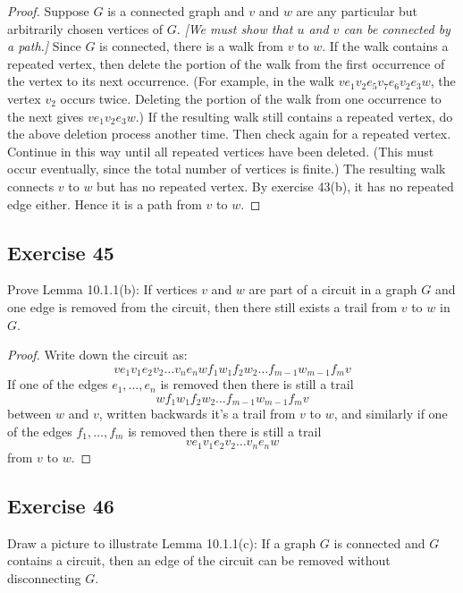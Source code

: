 \documentclass[14pt]{extarticle}
\begin{document}
\begin{proof}
Suppose \(G\) is a connected graph and \(v\) and \(w\) are any particular but arbitrarily chosen vertices of \(G\). {\it [We 
must show that \(u\) and \(v\) can be connected by a path.]} Since \(G\) is connected, there is a walk from \(v\) to \(w\). 
If the walk contains a repeated vertex, then delete the portion of the walk from the first occurrence of the vertex to 
its next occurrence. (For example, in the walk \(ve_1v_2e_5v_7e_6v_2e_3w\), the vertex \(v_2\) occurs twice. 
Deleting the portion of the walk from one occurrence to the next gives \(ve_1v_2e_3w\).) If the resulting walk still 
contains a repeated vertex, do the above deletion process another time. Then check again for a repeated vertex. Continue 
in this way until all repeated vertices have been deleted. (This must occur eventually, since the total number of 
vertices is finite.) The resulting walk connects \(v\) to \(w\) but has no repeated vertex. By exercise 43(b), it has no 
repeated edge either. Hence it is a path from \(v\) to \(w\).
\end{proof}

\subsection{Exercise 45}
Prove Lemma 10.1.1(b): If vertices \(v\) and \(w\) are part of a circuit in a graph \(G\) and one edge is removed from the 
circuit, then there still exists a trail from \(v\) to \(w\) in \(G\).

\begin{proof}
Write down the circuit as: 
\[
ve_1v_1e_2v_2 \ldots v_ne_nwf_1w_1f_2w_2 \ldots f_{m-1}w_{m-1}f_mv
\]
If one of the edges \(e_1, \ldots, e_n\) is removed then there is still a trail 
\[
wf_1w_1f_2w_2 \ldots f_{m-1}w_{m-1}f_mv
\] 
between \(w\) and \(v\), written backwards it's a trail from \(v\) to \(w\), and similarly if one of the edges \(f_1, \ldots, f_m\) is removed then there is still a trail
\[
ve_1v_1e_2v_2 \ldots v_ne_nw
\] 
from \(v\) to \(w\).
\end{proof}

\subsection{Exercise 46}
Draw a picture to illustrate Lemma 10.1.1(c): If a graph \(G\) is connected and \(G\) contains a circuit, then an edge of the 
circuit can be removed without disconnecting \(G\).
\end{document}
